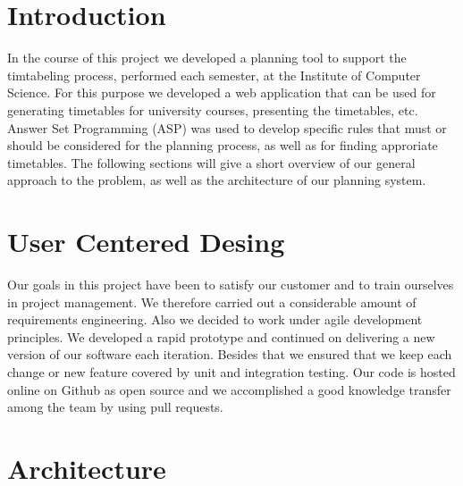 \documentclass[12pt]{article} %
\begin{document}

\tableofcontents %

\newpage %


\section{Introduction} 

In the course of this project we developed a planning tool to support the timtabeling process, performed each semester, at the Institute of Computer Science.
For this purpose we developed a web application that can be used for generating timetables for university courses, presenting the timetables, etc.
Answer Set Programming (ASP) \cite{ASP} was used to develop specific rules that must or should be considered for the planning process, as well as for finding approriate timetables.
The following sections will give a short overview of our general approach to the problem, as well as the architecture of our planning system.


\section{User Centered Desing} 

Our goals in this project have been to satisfy our customer and to train ourselves in project management.
We therefore carried out a considerable amount of requirements engineering.
Also we decided to work under agile development principles.
We developed a rapid prototype and continued on delivering a new version of our software each iteration.
Besides that we ensured that we keep each change or new feature covered by unit and integration testing.
Our code is hosted online on Github as open source and we accomplished a good knowledge transfer among the team by using pull requests.

\section{Architecture} %
\end{document}
